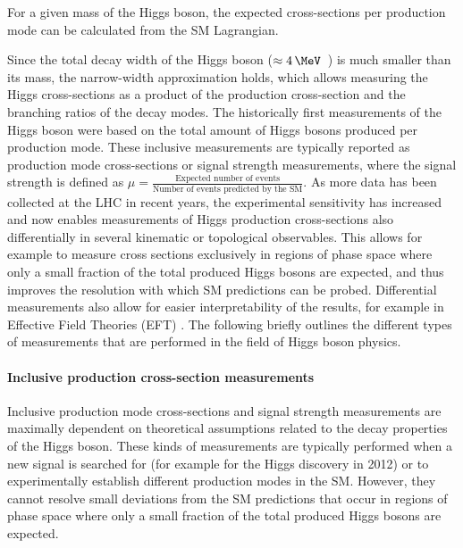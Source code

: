For a given mass of the Higgs boson, the expected cross-sections per production mode can be calculated from the SM Lagrangian. 

Since the total decay width of the Higgs boson ($\approx 4\,\MeV$~\cite{deFlorian:2016spz}) is much smaller than its mass, the narrow-width approximation holds, which allows measuring the Higgs cross-sections as a product of the production cross-section and the branching ratios of the decay modes.
The historically first measurements of the Higgs boson were based on the total amount of Higgs bosons produced per production mode. These inclusive measurements are typically reported as production mode cross-sections or signal strength measurements, where the signal strength is defined as $\mu = \frac{\text{Expected number of events}}{\text{Number of events predicted by the SM}}$. 
As more data has been collected at the LHC in recent years, the experimental sensitivity has increased and now enables measurements of Higgs production cross-sections also differentially in several kinematic or topological observables. 
This allows for example to measure cross sections exclusively in regions of phase space where only a small fraction of the total produced Higgs bosons are expected, and thus improves the resolution with which SM predictions can be probed.
Differential measurements also allow for easier interpretability of the results, for example in Effective Field Theories (EFT) .
The following briefly outlines the different types of measurements that are performed in the field of Higgs boson physics. 

\paragraph{Inclusive production cross-section measurements}
Inclusive production mode cross-sections and signal strength measurements are maximally dependent on theoretical assumptions related to the decay properties of the Higgs boson.
These kinds of measurements are typically performed when a new signal is searched for (for example for the Higgs discovery in 2012) or to experimentally establish different production modes in the SM.
However, they cannot resolve small deviations from the SM predictions that occur in regions of phase space where only a small fraction of the total produced Higgs bosons are expected.


